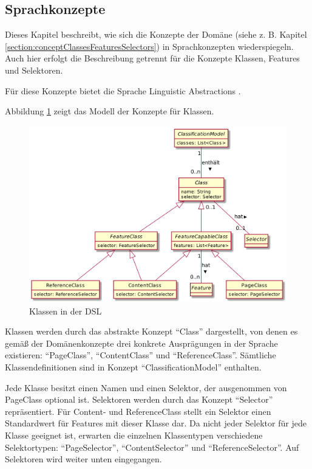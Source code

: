 \subsection{Sprachkonzepte}
    Dieses Kapitel beschreibt, wie sich die Konzepte der Domäne
    (siehe z. B. Kapitel \ref{section:conceptClassesFeaturesSelectors})
    in Sprachkonzepten wiederspiegeln.
    Auch hier erfolgt die Beschreibung getrennt für die Konzepte Klassen,
    Features und Selektoren.

    Für diese Konzepte bietet die Sprache Linguistic Abstractions
    \cite[Kapitel 4.1, 4.1.2]{voelter:DslEngineering}.

    Abbildung \ref{image:dslClasses} zeigt das Modell der Konzepte für Klassen.

    \begin{figure}[htb]
        \centering
        \includegraphics[width=\textwidth]{../resources/dsl/classes.png}
        \caption{Klassen in der DSL}
        \label{image:dslClasses}
    \end{figure}

    Klassen werden durch das abstrakte Konzept "`Class"' dargestellt,
    von denen es gemäß der Domänenkonzepte drei konkrete Ausprägungen in der Sprache
    existieren: "`PageClass"', "`ContentClass"' und "`ReferenceClass"'.
    Sämtliche Klassendefinitionen sind in Konzept "`ClassificationModel"' enthalten.

    Jede Klasse besitzt einen Namen und einen Selektor,
    der ausgenommen von PageClass optional ist.
    Selektoren werden durch das Konzept "`Selector"' repräsentiert.
    Für Content- und ReferenceClass stellt ein Selektor einen Standardwert
    für Features mit dieser Klasse dar.
    Da nicht jeder Selektor für jede Klasse geeignet ist,
    erwarten die einzelnen Klassentypen verschiedene Selektortypen:
    "`PageSelector"', "`ContentSelector"' und "`ReferenceSelector"'.
    Auf Selektoren wird weiter unten eingegangen.

